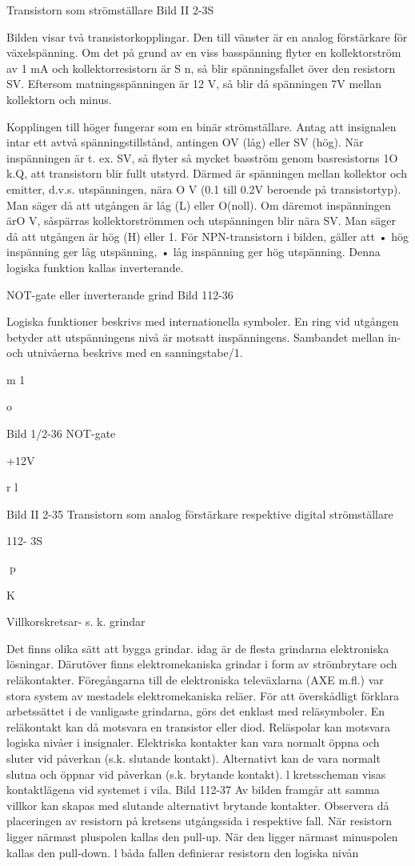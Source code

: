 {{Transistorn som strömställare
Bild II 2-3S

Bilden visar två transistorkopplingar. Den till
vänster är en analog förstärkare för växelspänning. Om det på grund av en viss basspänning flyter en kollektorström av 1 mA
och kollektorresistorn är S n, så blir spänningsfallet över den resistorn SV. Eftersom
matningsspänningen är 12 V, så blir då
spänningen 7V mellan kollektorn och minus.

Kopplingen till höger fungerar som en
binär strömställare. Antag att insignalen intar ett avtvå spänningstillstånd, antingen OV
(låg) eller SV (hög). När inspänningen är
t. ex. SV, så flyter så mycket basström genom
basresistorns 1O k.Q, att transistorn blir fullt
utstyrd.
Därmed är spänningen mellan kollektor
och emitter, d.v.s. utspänningen, nära O V
(0.1 till 0.2V beroende på transistortyp). Man
säger då att utgången är låg (L) eller O(noll).
Om däremot inspänningen ärO V, såspärras kollektorströmmen och utspänningen blir
nära SV. Man säger då att utgången är hög
(H) eller 1.
För NPN-transistorn i bilden, gäller att
• hög inspänning ger låg utspänning,
• låg inspänning ger hög utspänning.
Denna logiska funktion kallas inverterande.

NOT-gate eller inverterande grind
Bild 112-36

Logiska funktioner beskrivs med internationella symboler. En ring vid utgången betyder att utspänningens nivå är motsatt inspänningens. Sambandet mellan in- och utnivåerna beskrivs med en sanningstabe/1.

m
1

o

Bild 1/2-36 NOT-gate

+12V

r
l

Bild II 2-35 Transistorn som analog förstärkare respektive digital strömställare

112- 3S

p

K

Villkorskretsar- s. k. grindar

Det finns olika sätt att bygga grindar. idag är
de flesta grindarna elektroniska lösningar.
Därutöver finns elektromekaniska grindar i
form av strömbrytare och reläkontakter.
Föregångarna till de elektroniska televäxlarna (AXE m.fl.) var stora system av
mestadels elektromekaniska reläer.
För att överskådligt förklara arbetssättet
i de vanligaste grindarna, görs det enklast
med reläsymboler. En reläkontakt kan då
motsvara en transistor eller diod. Reläspolar
kan motsvara logiska nivåer i insignaler.
Elektriska kontakter kan vara normalt
öppna och sluter vid påverkan (s.k. slutande
kontakt). Alternativt kan de vara normalt
slutna och öppnar vid påverkan (s.k. brytande kontakt). l kretsscheman visas kontaktlägena vid systemet i vila.
Bild 112-37
Av bilden framgår att samma villkor kan
skapas med slutande alternativt brytande
kontakter. Observera då placeringen av resistorn på kretsens utgångssida i respektive
fall. När resistorn ligger närmast pluspolen
kallas den pull-up. När den ligger närmast
minuspolen kallas den pull-down. l båda
fallen definierar resistorn den logiska nivån

}}
